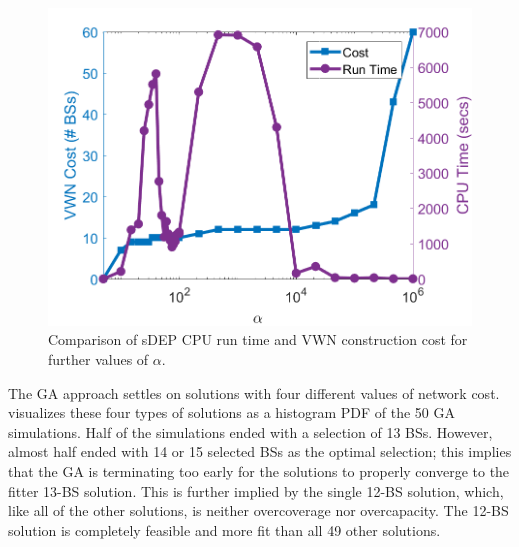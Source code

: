 \documentclass[12pt,dvipsnames]{report}
\begin{document}
\begin{figure}[htp]
	\centering
	\includegraphics[height=0.4\textheight]{Figures/Prelim_O25sDEPComparisonCostRunTimeExpandedAlpha}
	\caption[Expanded preliminary simulation comparison of sDEP run time and cost]{Comparison of sDEP CPU run time and VWN construction cost for further values of $\alpha$.}
	\label{fig:Prelim_sDEPCompCostRunTimeExpanded}
\end{figure}

The GA approach settles on solutions with four different values of network cost.   visualizes these four types of solutions as a histogram PDF of the 50 GA simulations.  Half of the simulations ended with a selection of 13 BSs.  However, almost half ended with 14 or 15 selected BSs as the optimal selection; this implies that the GA is terminating too early for the solutions to properly converge to the fitter 13-BS solution.  This is further implied by the single 12-BS solution, which, like all of the other solutions, is neither overcoverage nor overcapacity.  The 12-BS solution is completely feasible and more fit than all 49 other solutions.
\end{document}
